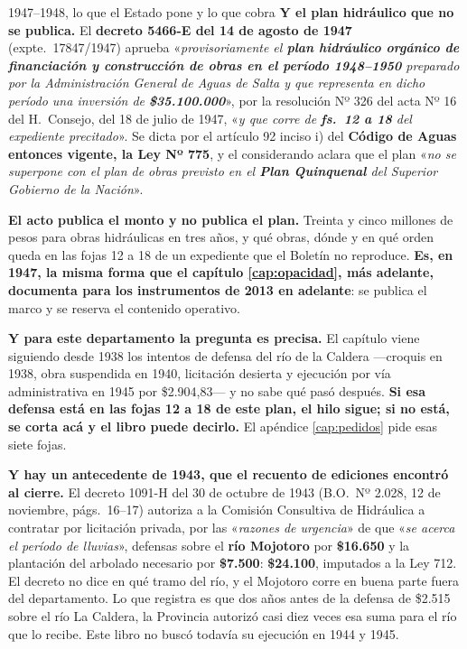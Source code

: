 \begin{ficha}{1947--1948, lo que el Estado pone y lo que cobra}
\textbf{Y el plan hidráulico que no se publica.} El \textbf{decreto 5466-E del 14 de agosto
de 1947} (expte.\ 17847/1947) aprueba «\textit{provisoriamente el \textbf{plan hidráulico
orgánico de financiación y construcción de obras en el período 1948--1950} preparado por la
Administración General de Aguas de Salta y que representa en dicho período una inversión de
\textbf{\$35.100.000}}», por la resolución Nº 326 del acta Nº 16 del H.\ Consejo, del 18 de
julio de 1947, «\textit{y que corre de \textbf{fs.\ 12 a 18} del expediente precitado}». Se
dicta por el artículo 92 inciso i) del \textbf{Código de Aguas entonces vigente, la Ley
Nº 775}, y el considerando aclara que el plan «\textit{no se superpone con el plan de obras
previsto en el \textbf{Plan Quinquenal} del Superior Gobierno de la Nación}».

\begin{cautela}
\textbf{El acto publica el monto y no publica el plan.} Treinta y cinco millones de pesos para
obras hidráulicas en tres años, y qué obras, dónde y en qué orden queda en las fojas 12 a 18
de un expediente que el Boletín no reproduce. \textbf{Es, en 1947, la misma forma que el
capítulo \ref{cap:opacidad}, más adelante, documenta para los instrumentos de 2013 en adelante}: se publica
el marco y se reserva el contenido operativo.

\textbf{Y para este departamento la pregunta es precisa.} El capítulo viene siguiendo desde
1938 los intentos de defensa del río de la Caldera ---croquis en 1938, obra suspendida en
1940, licitación desierta y ejecución por vía administrativa en 1945 por \$2.904,83--- y no sabe qué pasó
después. \textbf{Si esa defensa está en las fojas 12 a 18 de este plan, el hilo sigue; si no
está, se corta acá y el libro puede decirlo.} El apéndice \ref{cap:pedidos} pide esas siete
fojas.
\end{cautela}

\textbf{Y hay un antecedente de 1943, que el recuento de ediciones encontró al cierre.} El
decreto 1091-H del 30 de octubre de 1943 (B.O.\ Nº 2.028, 12 de noviembre, págs.\ 16--17)
autoriza a la Comisión Consultiva de Hidráulica a contratar por licitación privada, por las
«\textit{razones de urgencia}» de que «\textit{se acerca el período de lluvias}», defensas sobre
el \textbf{río Mojotoro} por \textbf{\$16.650} y la plantación del arbolado necesario por
\textbf{\$7.500}: \textbf{\$24.100}, imputados a la Ley 712. El decreto no dice en qué tramo del
río, y el Mojotoro corre en buena parte fuera del departamento. Lo que registra es que dos años
antes de la defensa de \$2.515 sobre el río La Caldera, la Provincia autorizó casi diez veces esa
suma para el río que lo recibe. Este libro no buscó todavía su ejecución en 1944 y 1945.


\end{ficha}
